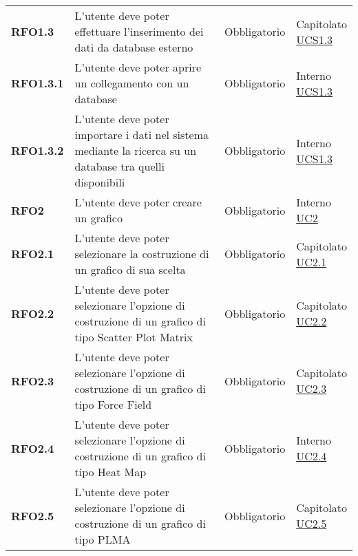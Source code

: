\begin{longtable}[H]{| >{\raggedright\bfseries}m{20mm} | >{\raggedright}m{90mm} | >{\centering}m{25mm} | >{\centering\arraybackslash}m{30mm}|}
    RFO1.3
    & L'utente deve poter effettuare l'inserimento dei dati da database esterno
    & Obbligatorio
    & \makecell{
        Capitolato \\
        \hyperref[ssub:ucs1.3]{UCS1.3}} \\

    RFO1.3.1
    &   L'utente deve poter aprire un collegamento con un database
    & Obbligatorio
    & \makecell{ Interno \\  \hyperref[ssub:ucs1.3]{UCS1.3}}\\

    RFO1.3.2
    &   L'utente deve poter importare i dati nel sistema mediante la ricerca
        su un database tra quelli disponibili
    & Obbligatorio
    & \makecell{ Interno \\ \hyperref[ssub:ucs1.3]{UCS1.3}}\\

    RFO2
    & L'utente deve poter creare un grafico
    & Obbligatorio
    & \makecell{ Interno \\ \hyperref[sub:uc2]{UC2}}\\

    RFO2.1
    & L'utente deve poter selezionare la costruzione di un grafico di sua scelta
    & Obbligatorio
    & \makecell{ Capitolato \\ \hyperref[ssub:uc2.1]{UC2.1}}\\

    RFO2.2
    & L'utente deve poter selezionare l'opzione di costruzione di un grafico di tipo Scatter Plot
    Matrix
    & Obbligatorio
    & \makecell{ Capitolato \\   \hyperref[ssub:uc2.2]{UC2.2}}\\

    RFO2.3
    & L'utente deve poter selezionare l'opzione di costruzione di un grafico di tipo Force Field
    & Obbligatorio
    & \makecell{ Capitolato \\  \hyperref[ssub:uc2.3]{UC2.3}}\\

    RFO2.4
    & L'utente deve poter selezionare l'opzione di costruzione di un grafico di tipo Heat Map
    & Obbligatorio
    & \makecell{ Interno \\  \hyperref[ssub:uc2.4]{UC2.4}}\\

    RFO2.5
    & L'utente deve poter selezionare l'opzione di costruzione di un grafico di tipo PLMA
    & Obbligatorio
    & \makecell{Capitolato \\ \hyperref[ssub:uc2.5]{UC2.5}}\\


\end{longtable}
